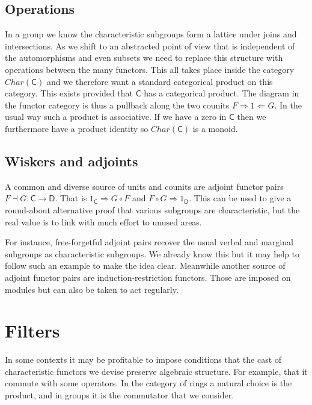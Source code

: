 \documentclass{amsart}
\begin{document}
\subsection{Operations}

In a group we know the characteristic subgroups form a lattice under joins and
intersections. As we shift to an abstracted point of view that is independent of
the automorphisms and even subsets we need to replace this structure with
operations between the many functors.  This all takes place inside the category
$Char(\mathsf{C})$ and we therefore want a standard categorical product on this
category.  This exists provided that $\mathsf{C}$ has a categorical product.
The diagram in the functor category is thus a pullback along the two counits
$F\Rightarrow 1\Leftarrow G$.  In the usual way such a product is associative.  
If we have a zero in $\mathsf{C}$ then we furthermore have a product identity 
so $Char(\mathsf{C})$ is a monoid.

\subsection{Wiskers and adjoints}

A common and diverse source of units and counits are adjoint functor pairs 
$F\dashv G:\mathsf{C}\to \mathsf{D}$.  That is $1_{\mathsf{C}}\Rightarrow G\circ F$ 
and $F\circ G\Rightarrow 1_{\mathsf{D}}$.  This can be used to give a round-about 
alternative proof that various subgroups are characteristic, but the real value is 
to link with much effort to unused areas.

For instance, free-forgetful adjoint pairs recover the usual verbal and marginal 
subgroups as characteristic subgroups.  We already know this but it may help to follow
such an example to make the idea clear.  Meanwhile another source of adjoint functor pairs 
are induction-restriction functors.  Those are imposed on modules but can also be taken to 
act regularly.

\section{Filters}

In some contexts it may be profitable to impose conditions that the cast of characteristic
functors we devise preserve algebraic structure.  For example, that it commute with 
some operators.  In the category of rings a natural choice is the product, and in groups 
it is the commutator that we consider.
\end{document}

